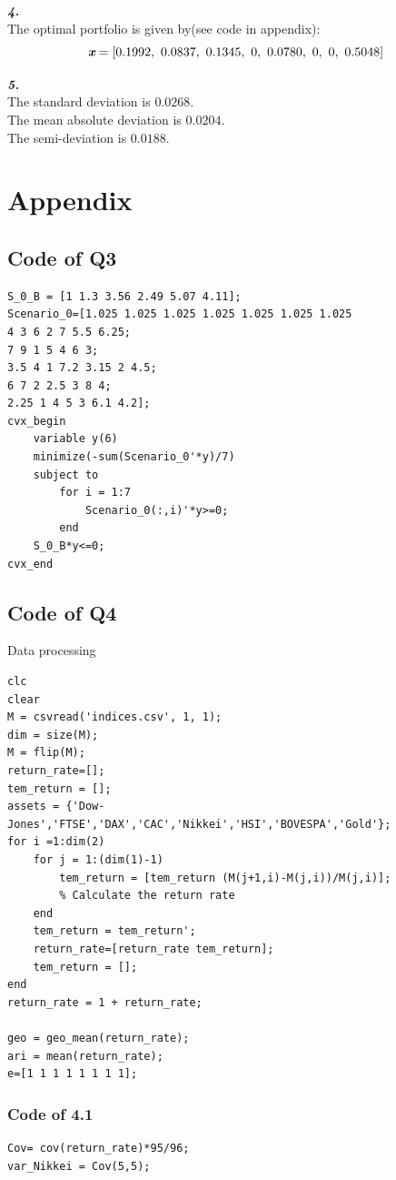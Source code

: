 \documentclass[11pt,a4paper]{article}
\begin{document}
\textit{\textbf{4.}}\\
The optimal portfolio is given by(see code in appendix):
$$\textit{\textbf{x}}=[0.1992,\    0.0837,\    0.1345,\    0,\    0.0780,\    0,\    0,\    0.5048]$$


\textit{\textbf{5.}}\\
The standard deviation is $0.0268$.\\
The mean absolute deviation is $0.0204$.\\
The semi-deviation is $0.0188$.
\section{Appendix}
\subsection{Code of Q3}
\begin{lstlisting}
S_0_B = [1 1.3 3.56 2.49 5.07 4.11];
Scenario_0=[1.025 1.025 1.025 1.025 1.025 1.025 1.025
4 3 6 2 7 5.5 6.25;
7 9 1 5 4 6 3;
3.5 4 1 7.2 3.15 2 4.5;
6 7 2 2.5 3 8 4;
2.25 1 4 5 3 6.1 4.2];
cvx_begin
	variable y(6)
	minimize(-sum(Scenario_0'*y)/7)
	subject to 
		for i = 1:7
			Scenario_0(:,i)'*y>=0;
		end
	S_0_B*y<=0;
cvx_end
\end{lstlisting}
\subsection{Code of Q4}
Data processing
\begin{lstlisting}
clc
clear
M = csvread('indices.csv', 1, 1);
dim = size(M);
M = flip(M);
return_rate=[];
tem_return = [];
assets = {'Dow-Jones','FTSE','DAX','CAC','Nikkei','HSI','BOVESPA','Gold'};
for i =1:dim(2)
	for j = 1:(dim(1)-1)
		tem_return = [tem_return (M(j+1,i)-M(j,i))/M(j,i)];
		% Calculate the return rate
	end
	tem_return = tem_return';
	return_rate=[return_rate tem_return];
	tem_return = [];
end
return_rate = 1 + return_rate;

geo = geo_mean(return_rate);
ari = mean(return_rate);
e=[1 1 1 1 1 1 1 1];
\end{lstlisting}

\subsubsection*{Code of 4.1}
\begin{lstlisting}
Cov= cov(return_rate)*95/96;
var_Nikkei = Cov(5,5);
\end{lstlisting}
\end{document}
